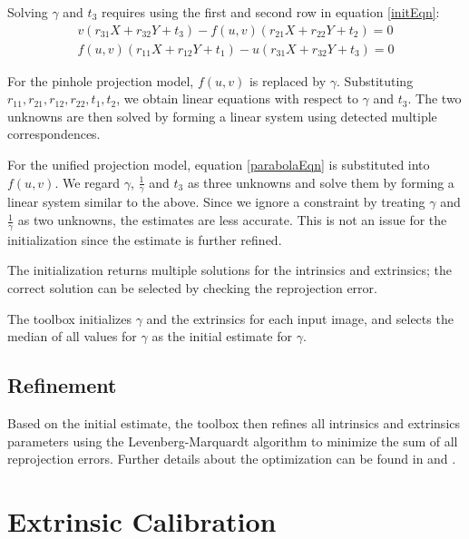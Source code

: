 \documentclass{report}
\begin{document}
Solving $\gamma$ and $t_3$ requires using the first and second row in equation \ref{initEqn}:
\begin{eqnarray}
v (r_{31} X + r_{32} Y + t_3) - f(u, v) (r_{21} X + r_{22} Y + t_2) = 0 \\ 
f(u, v) (r_{11} X + r_{12} Y + t_1) - u (r_{31} X + r_{32} Y + t_3) = 0
\end{eqnarray}

For the pinhole projection model, $f(u, v)$ is replaced by $\gamma$. Substituting $r_{11}, r_{21}, r_{12}, r_{22}, t_1, t_2$, we obtain linear equations with respect to $\gamma$ and $t_3$. The two unknowns are then solved by forming a linear system using detected multiple correspondences. 

For the unified projection model, equation \ref{parabolaEqn} is substituted into $f(u, v)$. We regard $\gamma$, $\frac{1}{\gamma}$ and $t_3$ as three unknowns and solve them by forming a linear system similar to the above. Since we ignore a constraint by treating $\gamma$ and $\frac{1}{\gamma}$ as two unknowns, the estimates are less accurate. This is not an issue for the initialization since the estimate is further refined. 

The initialization returns multiple solutions for the intrinsics and extrinsics; the correct solution can be selected by checking the reprojection error. 

The toolbox initializes $\gamma$ and the extrinsics for each input image, and selects the median of all values for $\gamma$ as the initial estimate for $\gamma$. 

\section{Refinement}
Based on the initial estimate, the toolbox then refines all intrinsics and extrinsics parameters using the Levenberg-Marquardt algorithm to minimize the sum of all reprojection errors. Further details about the optimization can be found in \cite{mei2007single} and \cite{scaramuzza2006toolbox}.




\chapter{Extrinsic Calibration}
\end{document}
